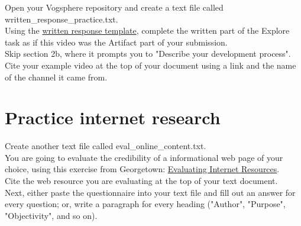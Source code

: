 \documentclass{42-en}
\begin{document}
Open your Vogsphere repository and create a text file called written\_response\_practice.txt.\\

Using the \href{https://drive.google.com/open?id=0BwtvDcLkkxXgQUlVeDZHaEZySWM}{written response template}, complete the written part of the Explore task as if this video was the Artifact part of your submission. \\

Skip section 2b, where it prompts you to "Describe your development process".\\

Cite your example video at the top of your document using a link and the name of the channel it came from.\\

\section{Practice internet research}

Create another text file called eval\_online\_content.txt.\\

You are going to evaluate the credibility of a informational web page of your choice, using this exercise from Georgetown: \href{https://www.library.georgetown.edu/tutorials/research-guides/evaluating-internet-content}{Evaluating Internet Resources}.\\

Cite the web resource you are evaluating at the top of your text document.\\

Next, either paste the questionnaire into your text file and fill out an answer for every question; or, write a paragraph for every heading ("Author", "Purpose", "Objectivity", and so on).\\
\end{document}
